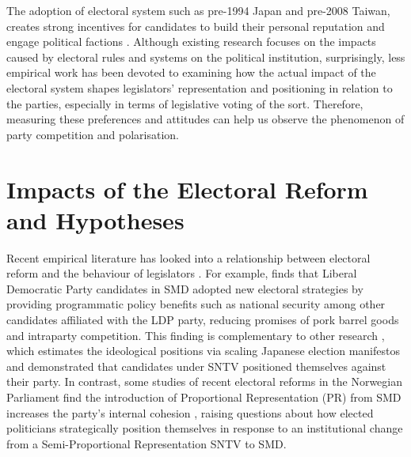 The adoption of electoral system such as pre-1994 Japan and pre-2008 Taiwan, creates strong incentives for candidates to build their personal reputation \citep[][]{Batto2005, Carey1995,Huang2017,Lin2016, Hirano2006} and engage political factions \citep[][]{Batto2016}.  Although existing research focuses on the impacts caused by electoral rules and systems on the political institution, surprisingly, less empirical work has been devoted to examining how the actual impact of the electoral system shapes legislators' representation and positioning in relation to the parties, especially in terms of legislative voting of the sort. Therefore, measuring these preferences and attitudes can help us observe the phenomenon of party competition and polarisation. 

\section*{\centering Impacts of the Electoral Reform and Hypotheses}

Recent empirical literature has looked into a relationship between electoral reform and the behaviour of legislators \citep[e.g.][]{Cox2019, Catalinac2016, Catalinac2017}. For example, \citet{Catalinac2016} finds that Liberal Democratic Party candidates in SMD adopted new electoral strategies by providing programmatic policy benefits such as national security among other candidates affiliated with the LDP party, reducing promises of pork barrel goods and intraparty competition. This finding is complementary to other research \citet{Catalinac2017}, which estimates the ideological positions via scaling Japanese election manifestos and demonstrated that candidates under SNTV positioned themselves against their party. In contrast, some studies of recent electoral reforms in the Norwegian Parliament find the introduction of Proportional Representation (PR) from SMD increases the party's internal cohesion \citep{Hoyland2019, Cox2019}, raising questions about how elected politicians strategically position themselves in response to an institutional change from a Semi-Proportional Representation \textemdash SNTV to SMD. 

